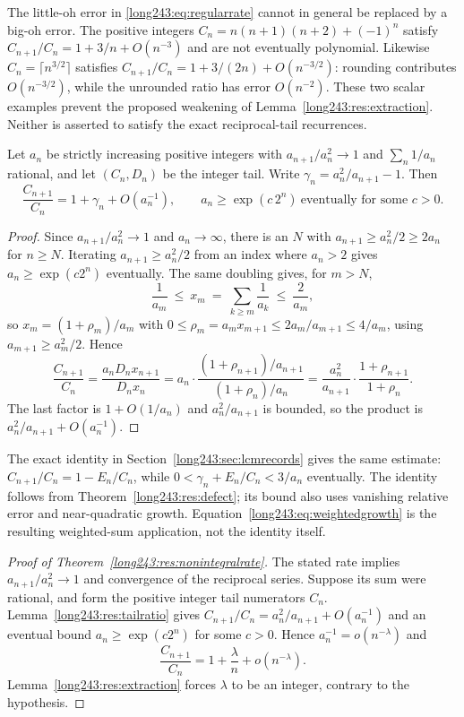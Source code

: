 \documentclass[11pt]{article}
\begin{document}
The little-oh error in \eqref{long243:eq:regularrate} cannot in general
be replaced by a big-oh error. The positive integers
$C_n=n(n+1)(n+2)+(-1)^n$ satisfy $C_{n+1}/C_n=1+3/n+O(n^{-3})$ and are not
eventually polynomial.
Likewise $C_n=\lceil n^{3/2}\rceil$ satisfies
$C_{n+1}/C_n=1+3/(2n)+O(n^{-3/2})$: rounding contributes
$O(n^{-3/2})$, while the unrounded ratio has error $O(n^{-2})$.
These two scalar examples prevent the proposed weakening of
Lemma~\ref{long243:res:extraction}. Neither is asserted to satisfy the
exact reciprocal-tail recurrences.

\begin{lemma}\label{long243:res:tailratio}
Let $a_n$ be strictly increasing positive integers with $a_{n+1}/a_n^2\to1$ and
$\sum_n1/a_n$ rational, and let $(C_n,D_n)$ be the integer tail.
Write $\gamma_n=a_n^2/a_{n+1}-1$.  Then
\[
 \frac{C_{n+1}}{C_n}=1+\gamma_n+O(a_n^{-1}),
 \qquad a_n\ge\exp(c\,2^n)\ \text{eventually for some }c>0 .
\]
\end{lemma}

\begin{proof}
Since $a_{n+1}/a_n^2\to1$ and $a_n\to\infty$, there is an $N$ with
$a_{n+1}\ge a_n^2/2\ge2a_n$ for $n\ge N$.  Iterating $a_{n+1}\ge a_n^2/2$ from
an index where $a_n>2$ gives $a_n\ge\exp(c2^n)$ eventually.  The same doubling
gives, for $m>N$,
\[
 \frac1{a_m}\ \le\ x_m\ =\ \sum_{k\ge m}\frac1{a_k}\ \le\ \frac2{a_m},
\]
so $x_{m}=(1+\rho_{m})/a_{m}$ with
$0\le\rho_{m}=a_mx_{m+1}\le 2a_m/a_{m+1}\le4/a_m$, using
$a_{m+1}\ge a_m^2/2$.  Hence
\[
 \frac{C_{n+1}}{C_n}=\frac{a_nD_nx_{n+1}}{D_nx_n}
 =a_n\cdot\frac{(1+\rho_{n+1})/a_{n+1}}{(1+\rho_n)/a_n}
 =\frac{a_n^2}{a_{n+1}}\cdot\frac{1+\rho_{n+1}}{1+\rho_n}.
\]
The last factor is $1+O(1/a_n)$ and $a_n^2/a_{n+1}$ is bounded, so the product
is $a_n^2/a_{n+1}+O(a_n^{-1})$.
\end{proof}

The exact identity in Section~\ref{long243:sec:lcmrecords} gives the same
estimate: $C_{n+1}/C_n=1-E_n/C_n$, while
$0<\gamma_n+E_n/C_n<3/a_n$ eventually. The identity follows from
Theorem~\ref{long243:res:defect}; its bound also uses vanishing relative
error and near-quadratic growth. Equation~\eqref{long243:eq:weightedgrowth}
is the resulting weighted-sum application, not the identity itself.

\begin{proof}[Proof of Theorem~\ref{long243:res:nonintegralrate}]
The stated rate implies $a_{n+1}/a_n^2\to1$ and convergence of the
reciprocal series. Suppose its sum were rational, and form the positive
integer tail numerators $C_n$. Lemma~\ref{long243:res:tailratio} gives
$C_{n+1}/C_n=a_n^2/a_{n+1}+O(a_n^{-1})$ and an eventual bound
$a_n\ge\exp(c2^n)$ for some $c>0$. Hence $a_n^{-1}=o(n^{-\lambda})$ and
\[
 \frac{C_{n+1}}{C_n}=1+\frac{\lambda}{n}+o(n^{-\lambda}).
\]
Lemma~\ref{long243:res:extraction} forces $\lambda$ to be an integer,
contrary to the hypothesis.
\end{proof}
\end{document}
